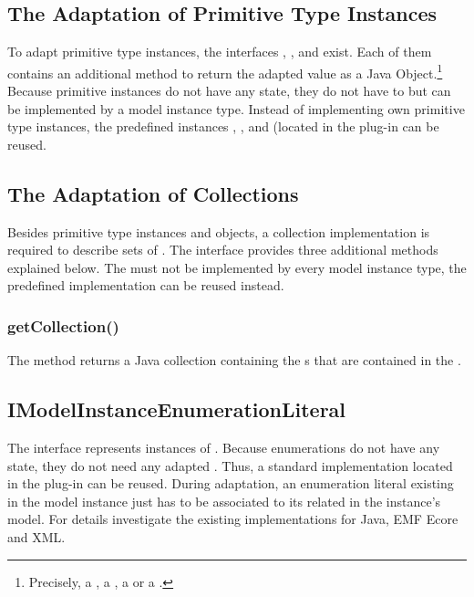 \subsection{The Adaptation of Primitive Type Instances}

To adapt primitive type instances, the interfaces , 
,  and 
 exist. Each of them contains an additional method 
to return the adapted value as a Java Object.\footnote{Precisely, a 
, a , a  or a .} Because 
primitive instances do not have any state, they do not have to but can be
implemented by a model instance type. Instead of implementing own primitive 
type instances, the predefined instances , 
,  and 
 (located in the plug-in 
 can be reused.


\subsection{The Adaptation of Collections}

Besides primitive type instances and objects, a collection implementation is 
required to describe sets of . The interface 
 provides three
additional methods explained below. The  
must not be implemented by every model instance type, the predefined
implementation  can be reused instead.

\subsubsection{getCollection()}

The method  returns a Java collection containing the 
s that are contained in the
.


\subsection{IModelInstanceEnumerationLiteral}

The interface  represents instances of 
. Because enumerations do not have any state, they do not
need any adapted . Thus, a standard 
 implementation located in the plug-in
 can be reused. During
adaptation, an enumeration literal existing in the model instance just has to
be associated to its related  in the instance's model.
For details investigate the existing  implementations for 
Java, \acs{EMF} Ecore and \acs{XML}.


